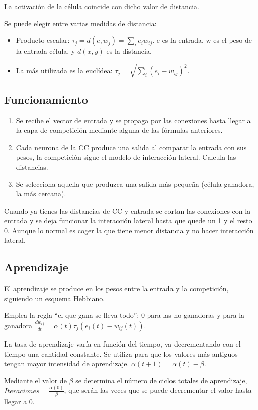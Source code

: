 \documentclass[12pt, twoside, openright]{report} %
\begin{document}
La activación de la célula coincide con dicho valor de distancia.

Se puede elegir entre varias medidas de distancia:
\begin{itemize}
	\item Producto escalar: $\tau_j=d(e,w_j)=\sum_i e_iw_{ij}$. e es la entrada, w es el peso de la entrada-célula, y $d(x, y)$ es la distancia.
	\item La más utilizada es la euclídea: $\tau_j= \sqrt{\sum_i (e_i - w_{ij})^2}$.
\end{itemize}

\subsection{Funcionamiento}
\begin{enumerate}
	\item Se recibe el vector de entrada y se propaga por las conexiones hasta llegar a la capa de competición mediante alguna de las fórmulas anteriores.
	\item Cada neurona de la CC produce una salida al comparar la entrada con sus pesos, la competición sigue el modelo de interacción lateral. Calcula las distancias.
	\item Se selecciona aquella que produzca una salida más pequeña (célula ganadora, la más cercana).
\end{enumerate}

Cuando ya tienes las distancias de CC y entrada se cortan las conexiones con la entrada y se deja funcionar la interacción lateral hasta que quede un 1 y el resto 0. Aunque lo normal es coger la que tiene menor distancia y no hacer interacción lateral.

\subsection{Aprendizaje}
El aprendizaje se produce en los pesos entre la entrada y la competición, siguiendo un esquema Hebbiano.

Emplea la regla “el que gana se lleva todo”: 0 para las no ganadoras y para la ganadora $\frac{dw_{ij}}{dt}=\alpha(t)\tau_j (e_i(t)-w_{ij}(t))$.

La tasa de aprendizaje varía en función del tiempo, va decrementando con el tiempo una cantidad constante. Se utiliza para que los valores más antiguos tengan mayor intensidad de aprendizaje. $\alpha(t+1)=\alpha (t) - \beta$.

Mediante el valor de $\beta$ se determina el número de ciclos totales de aprendizaje, $\textit{Iteraciones}=\frac{\alpha(0)}{\beta}$, que serán las veces que se puede decrementar el valor hasta llegar a 0.
\end{document}
